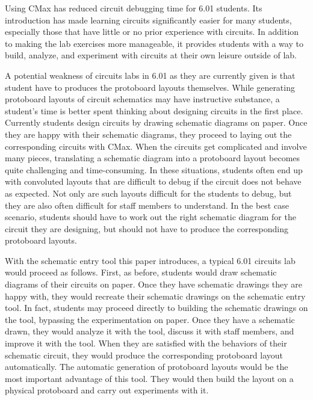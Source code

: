 Using CMax has reduced circuit debugging time for 6.01 students.
Its introduction has made
learning circuits significantly easier for many students, especially those that
have little or no prior experience with circuits. In addition to making the lab
exercises more manageable, it provides students with a way to
build, analyze, and experiment with circuits at their own leisure outside of lab.

A potential weakness of circuits labs in 6.01 as they are currently given is
that student have to produces the protoboard layouts themselves.
While generating protoboard layouts
of circuit schematics may have instructive substance, a student's time is better
spent thinking about designing circuits in the first place.
Currently students design circuits by drawing schematic diagrams on paper.
Once they are happy with
their schematic diagrams, they proceed to laying out the corresponding circuits
with CMax. When the circuits get complicated and involve many pieces,
translating a
schematic diagram into a protoboard layout becomes quite challenging and
time-consuming. In these situations, students often end up with convoluted
layouts that are difficult to debug if the circuit does not behave as expected.
Not only are such layouts difficult for the
students to debug, but they are also often difficult for staff
members to understand. In the best case scenario, students should have to work
out the right schematic diagram for the circuit they are designing,
but should not have
to produce the corresponding protoboard layouts.

With the schematic entry tool this paper introduces, a typical 6.01 circuits lab
would proceed as follows. First, as before, students would draw schematic
diagrams of their circuits on paper. Once they have
schematic drawings they are happy with, they would recreate their schematic
drawings on the schematic entry tool. In fact, students may proceed directly to
building the schematic drawings on the tool, bypassing the
experimentation on
paper. Once they have a schematic drawn, they would analyze it with the tool,
discuss it with staff members, and improve it with the tool. When they are
satisfied with the behaviors of their schematic circuit, they would produce the
corresponding protoboard layout automatically. The automatic generation of
protoboard layouts would be
the most important advantage of this tool. They would then build the layout on a
physical protoboard and carry out experiments with it.

